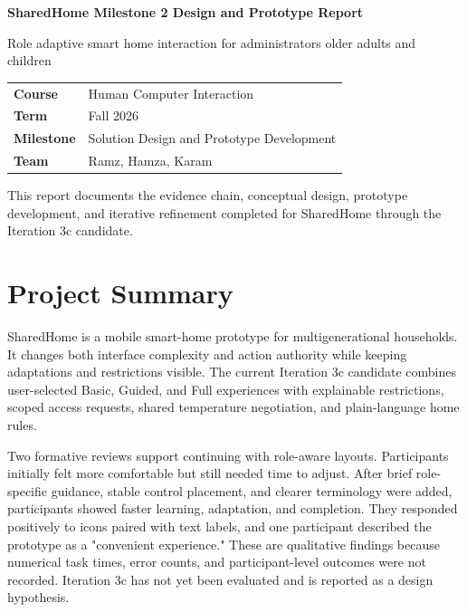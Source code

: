 \documentclass[11pt,letterpaper]{article}
\begin{document}
\begin{titlepage}
  \vspace*{0.7in}
  {\Huge\bfseries SharedHome Milestone 2 Design and Prototype Report\par}
  \vspace{0.35in}
  {\Large\color{SharedNavy}Role adaptive smart home interaction for administrators older adults and children\par}

  \vspace{0.55in}
  \begin{tabular}{@{}ll@{}}
    \textbf{Course} & Human Computer Interaction\\[0.35em]
    \textbf{Term} & Fall 2026\\[0.35em]
    \textbf{Milestone} & Solution Design and Prototype Development\\[0.35em]
    \textbf{Team} & Ramz, Hamza, Karam
  \end{tabular}

  \vfill
  This report documents the evidence chain, conceptual design, prototype development,
  and iterative refinement completed for SharedHome through the Iteration 3c candidate.
  \vspace{0.7in}
\end{titlepage}

\section{Project Summary}

SharedHome is a mobile smart-home prototype for multigenerational households. It changes
both interface complexity and action authority while keeping adaptations and restrictions
visible. The current Iteration 3c candidate combines user-selected Basic, Guided, and Full
experiences with explainable restrictions, scoped access requests, shared temperature
negotiation, and plain-language home rules.

Two formative reviews support continuing with role-aware layouts. Participants initially
felt more comfortable but still needed time to adjust. After brief role-specific guidance,
stable control placement, and clearer terminology were added, participants showed faster
learning, adaptation, and completion. They responded positively to icons paired with text
labels, and one participant described the prototype as a "convenient experience." These
are qualitative findings because numerical task times, error counts, and participant-level
outcomes were not recorded. Iteration 3c has not yet been evaluated and is reported as a
design hypothesis.
\end{document}
